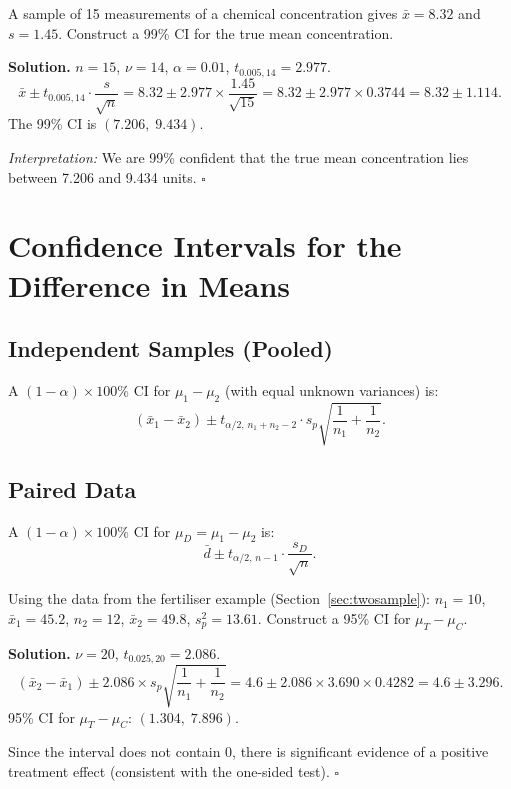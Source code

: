 \documentclass[12pt, a4paper, oneside]{book}
\theoremstyle{definition}
\theoremstyle{plain}
\theoremstyle{remark}
\newenvironment{solution}
  {\par\medskip\noindent\textbf{Solution.}\quad}
  {\hfill$\square$\par\medskip}
\begin{document}
\begin{workedexample}[--- Constructing a CI]
A sample of 15 measurements of a chemical concentration gives
$\bar{x}=8.32$ and $s=1.45$.  Construct a 99\% CI for the true mean
concentration.

\begin{solution}
$n=15$, $\nu=14$, $\alpha=0.01$, $t_{0.005,14}=2.977$.
\[
  \bar{x}\pm t_{0.005,14}\cdot\frac{s}{\sqrt{n}}
  = 8.32\pm 2.977\times\frac{1.45}{\sqrt{15}}
  = 8.32\pm 2.977\times 0.3744
  = 8.32\pm 1.114.
\]
The 99\% CI is $(7.206,\;9.434)$.

\medskip
\textit{Interpretation:} We are 99\% confident that the true mean
concentration lies between 7.206 and 9.434 units.
\end{solution}
\end{workedexample}

\section{Confidence Intervals for the Difference in Means}
\label{sec:ci-diff}

\subsection{Independent Samples (Pooled)}

A $(1-\alpha)\times 100\%$ CI for $\mu_1-\mu_2$ (with equal unknown
variances) is:
\[
  (\bar{x}_1-\bar{x}_2) \pm t_{\alpha/2,\,n_1+n_2-2}\cdot s_p\sqrt{\frac{1}{n_1}+\frac{1}{n_2}}.
\]

\subsection{Paired Data}

A $(1-\alpha)\times 100\%$ CI for $\mu_D = \mu_1 - \mu_2$ is:
\[
  \bar{d} \pm t_{\alpha/2,\,n-1}\cdot\frac{s_D}{\sqrt{n}}.
\]

\begin{workedexample}
Using the data from the fertiliser example (Section~\ref{sec:twosample}):
$n_1=10$, $\bar{x}_1=45.2$, $n_2=12$, $\bar{x}_2=49.8$, $s_p^2=13.61$.
Construct a 95\% CI for $\mu_T-\mu_C$.

\begin{solution}
$\nu=20$, $t_{0.025,20}=2.086$.
\[
  (\bar{x}_2-\bar{x}_1)\pm 2.086\times s_p\sqrt{\frac{1}{n_1}+\frac{1}{n_2}}
  = 4.6\pm 2.086\times 3.690\times 0.4282
  = 4.6\pm 3.296.
\]
95\% CI for $\mu_T-\mu_C$: $(1.304,\;7.896)$.

Since the interval does not contain 0, there is significant evidence of a
positive treatment effect (consistent with the one-sided test).
\end{solution}
\end{workedexample}
\end{document}
